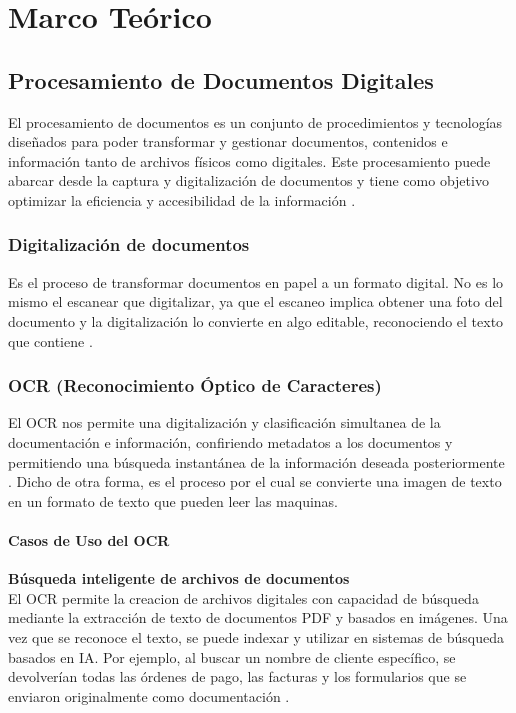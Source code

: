 \chapter{Marco Teórico}


\section{Procesamiento de Documentos Digitales}
El procesamiento de documentos es un conjunto de procedimientos y tecnologías diseñados para poder transformar y gestionar documentos, contenidos e información 
tanto de archivos físicos como digitales. Este procesamiento puede abarcar desde la captura y digitalización de documentos y tiene como objetivo optimizar la eficiencia y 
accesibilidad de la información \cite{Athento}.

\subsection{Digitalización de documentos}
Es el proceso de transformar documentos en papel a un formato digital. No es lo mismo el escanear que digitalizar, ya que el escaneo implica obtener una foto del documento 
y la digitalización lo convierte en algo editable, reconociendo el texto que contiene \cite{T. Portal}. 

\subsection{OCR (Reconocimiento Óptico de Caracteres)}
El OCR nos permite una digitalización y clasificación simultanea de la documentación e información, confiriendo metadatos a los documentos y permitiendo una búsqueda 
instantánea de la información deseada posteriormente \cite{T. Portal}. Dicho de otra forma, es el proceso por el cual se convierte una imagen de texto en un formato de texto que pueden 
leer las maquinas.


\subsubsection{Casos de Uso del OCR}

\textbf{Búsqueda inteligente de archivos de documentos} \\
El OCR permite la creacion de archivos digitales con capacidad de búsqueda mediante la extracción de texto de documentos PDF y basados en imágenes. 
Una vez que se reconoce el texto, se puede indexar y utilizar en sistemas de búsqueda basados en IA. Por ejemplo, al buscar un nombre de cliente específico, 
se devolverían todas las órdenes de pago, las facturas y los formularios que se enviaron originalmente como documentación \cite{AWS}.

